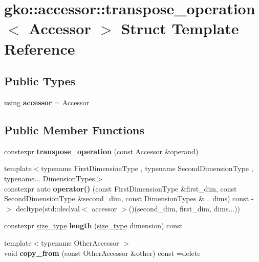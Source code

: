 \hypertarget{structgko_1_1accessor_1_1transpose__operation}{}\section{gko\+:\+:accessor\+:\+:transpose\+\_\+operation$<$ Accessor $>$ Struct Template Reference}
\label{structgko_1_1accessor_1_1transpose__operation}
\subsection*{Public Types}
\begin{DoxyCompactItemize}
\item 
\mbox{\label{structgko_1_1accessor_1_1transpose__operation_a4c58a0b571a8926648dd109c9427e893}} 
using {\bfseries accessor} = Accessor
\end{DoxyCompactItemize}
\subsection*{Public Member Functions}
\begin{DoxyCompactItemize}
\item 
\mbox{\label{structgko_1_1accessor_1_1transpose__operation_a7282a12879818e2f34ef8b2a67d4af84}} 
constexpr {\bfseries transpose\+\_\+operation} (const Accessor \&operand)
\item 
\mbox{\label{structgko_1_1accessor_1_1transpose__operation_ac44c06fc6b062dbdab202ad90b16e459}} 
{\footnotesize template$<$typename First\+Dimension\+Type , typename Second\+Dimension\+Type , typename... Dimension\+Types$>$ }\\constexpr auto {\bfseries operator()} (const First\+Dimension\+Type \&first\+\_\+dim, const Second\+Dimension\+Type \&second\+\_\+dim, const Dimension\+Types \&... dims) const -\/$>$ decltype(std\+::declval$<$ accessor $>$()(second\+\_\+dim, first\+\_\+dim, dims...))
\item 
\mbox{\label{structgko_1_1accessor_1_1transpose__operation_a9bab2e4cfc2bb2da896f7e7a087da884}} 
constexpr \hyperlink{namespacegko_a6e5c95df0ae4e47aab2f604a22d98ee7}{size\+\_\+type} {\bfseries length} (\hyperlink{namespacegko_a6e5c95df0ae4e47aab2f604a22d98ee7}{size\+\_\+type} dimension) const
\item 
\mbox{\label{structgko_1_1accessor_1_1transpose__operation_a81d351daab2008659335c9190043e32b}} 
{\footnotesize template$<$typename Other\+Accessor $>$ }\\void {\bfseries copy\+\_\+from} (const Other\+Accessor \&other) const =delete
\end{DoxyCompactItemize}
